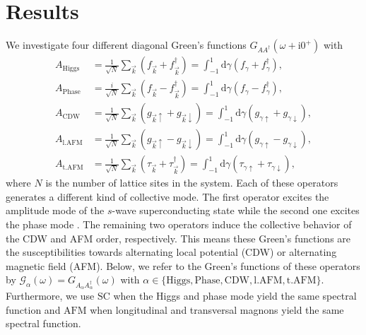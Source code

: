 \documentclass[
    reprint, 
    aps,
    preprintnumbers,
    twocolumn,
    prb,
    superscriptaddress
]{revtex4-2}
\newcommand{\vk}{\vec{k}}
\newcommand{\up}{\uparrow}
\newcommand{\down}{\downarrow}
\newcommand{\im}{\mathrm{i}}
\newcommand{\dgamma}{\mathrm{d}\gamma}
\begin{document}

\section{Results}
\label{sec:results}


We investigate four different diagonal Green's functions $G_{AA^\dagger}(\omega + \im 0^+)$ with
\begin{subequations}
    \label{eqn:resolvent_bases}
    \begin{align}
        A_\text{Higgs} &= \frac{1}{\sqrt{N}} \sum_{\vk} \left( f_{\vk} + f_{\vk}^\dagger \right)  
            = \int_{-1}^1 \dgamma \left( f_{\gamma} + f_{\gamma}^\dagger \right) ,\\
        A_\text{Phase} &= \frac{i}{\sqrt{N}} \sum_{\vk} \left( f_{\vk} - f_{\vk}^\dagger \right) = 
				\int_{-1}^1 \dgamma \left( f_{\gamma} - f_{\gamma}^\dagger \right) ,\\
        A_\text{CDW}   &= \frac{1}{\sqrt{N}} \sum_{\vk} \left( g_{\vk \up} + g_{\vk \down} \right) = 
				\int_{-1}^1 \dgamma \left( g_{\gamma \up} + g_{\gamma \down} \right) ,\\
        A_\text{l.AFM}   &= \frac{1}{\sqrt{N}} \sum_{\vk} \left( g_{\vk \up} - g_{\vk \down} \right) = 
				\int_{-1}^1 \dgamma \left( g_{\gamma \up} - g_{\gamma \down} \right) , \\
        A_\text{t.AFM}   &= \frac{1}{\sqrt{N}} \sum_{\vk} \left( \tau_{\vk} + \tau_{\vk}^\dagger \right) = 
				\int_{-1}^1 \dgamma \left( \tau_{\gamma \up} + \tau_{\gamma \down} \right) ,
    \end{align}
\end{subequations}
where $N$ is the number of lattice sites in the system. 
Each of these operators generates a different kind of collective mode.
The first operator excites the amplitude mode of the $s$-wave superconducting state
while the second one excites the phase mode \cite{Fan22}.
The remaining two operators induce the collective behavior of the CDW and AFM order, respectively.
This means these Green's functions are the susceptibilities towards alternating local potential (CDW) or
alternating magnetic field (AFM).
Below, we refer to the Green's functions of these operators by
$\mathcal{G}_{\alpha}(\omega) = G_{A_\alpha A_\alpha^\dagger}(\omega)$ 
with $\alpha \in \{ \text{Higgs}, \text{Phase}, \text{CDW}, \text{l.AFM}, \text{t.AFM} \}$.
Furthermore, we use $\text{SC}$ when the Higgs and phase mode yield the same spectral function and
$\text{AFM}$ when longitudinal and transversal magnons yield the same spectral function.
\end{document}
